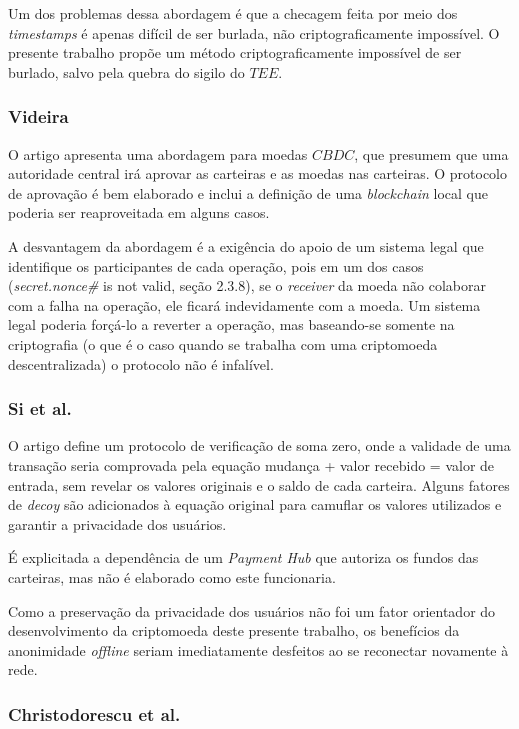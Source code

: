 \documentclass[
  12pt,
  a4paper,
  oneside,
  article,
]{abntex2}
\begin{document}
Um dos problemas dessa abordagem é que a checagem feita por meio dos \textit{\textit{timestamps}} é apenas difícil de ser burlada, não criptograficamente impossível. O presente trabalho propõe um método criptograficamente impossível de ser burlado, salvo pela quebra do sigilo do $TEE$.

\subsubsection{Videira}

O artigo apresenta uma abordagem para moedas $CBDC$, que presumem que uma autoridade central irá aprovar as carteiras e as moedas nas carteiras. O protocolo de aprovação é bem elaborado e inclui a definição de uma \textit{blockchain} local que poderia ser reaproveitada em alguns casos.

A desvantagem da abordagem é a exigência do apoio de um sistema legal que identifique os participantes de cada operação, pois em um dos casos (\textit{secret.\textit{nonce}\#} is not valid, seção 2.3.8), se o \textit{receiver} da moeda não colaborar com a falha na operação, ele ficará indevidamente com a moeda. Um sistema legal poderia forçá-lo a reverter a operação, mas baseando-se somente na criptografia (o que é o caso quando se trabalha com uma criptomoeda descentralizada) o protocolo não é infalível.

\subsubsection{Si et al.}

O artigo define um protocolo de verificação de soma zero, onde a validade de uma transação seria comprovada pela equação mudança + valor recebido = valor de entrada, sem revelar os valores originais e o saldo de cada carteira. Alguns fatores de \textit{decoy} são adicionados à equação original para camuflar os valores utilizados e garantir a privacidade dos usuários.

É explicitada a dependência de um \textit{Payment Hub} que autoriza os fundos das carteiras, mas não é elaborado como este funcionaria.

Como a preservação da privacidade dos usuários não foi um fator orientador do desenvolvimento da criptomoeda deste presente trabalho, os benefícios da anonimidade \textit{offline} seriam imediatamente desfeitos ao se reconectar novamente à rede.

\subsubsection{Christodorescu et al.}
\end{document}
